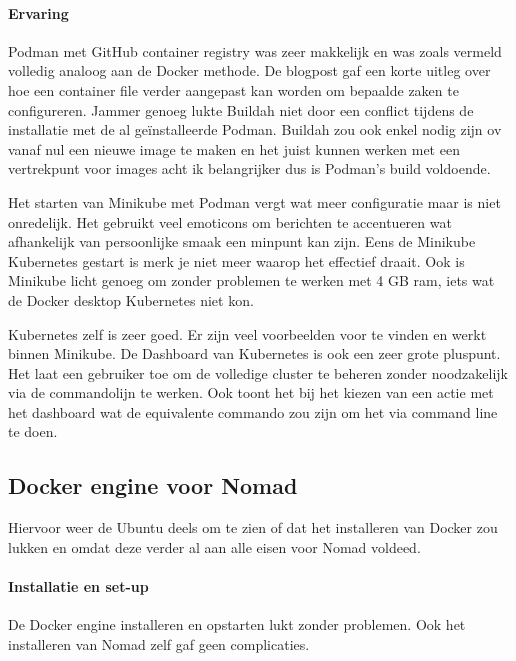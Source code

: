 \paragraph{Ervaring}
Podman met GitHub container registry was zeer makkelijk en was zoals vermeld volledig analoog aan de Docker methode. De blogpost gaf een korte uitleg over hoe een container file verder aangepast kan worden om bepaalde zaken te configureren. Jammer genoeg lukte Buildah niet door een conflict tijdens de installatie met de al geïnstalleerde Podman. Buildah zou ook enkel nodig zijn ov vanaf nul een nieuwe image te maken en het juist kunnen werken met een vertrekpunt voor images acht ik belangrijker dus is Podman’s build voldoende.

Het starten van Minikube met Podman vergt wat meer configuratie maar is niet onredelijk. Het gebruikt veel emoticons om berichten te accentueren wat afhankelijk van persoonlijke smaak een minpunt kan zijn. Eens de Minikube Kubernetes gestart is merk je niet meer waarop het effectief draait. Ook is Minikube licht genoeg om zonder problemen te werken met 4 GB ram, iets wat de Docker desktop Kubernetes niet kon.

Kubernetes zelf is zeer goed. Er zijn veel voorbeelden voor te vinden en werkt binnen Minikube. De Dashboard van Kubernetes is ook een zeer grote pluspunt. Het laat een gebruiker toe om de volledige cluster te beheren zonder noodzakelijk via de commandolijn te werken. Ook toont het bij het kiezen van een actie met het dashboard wat de equivalente commando zou zijn om het via command line te doen.


\subsection{Docker engine voor Nomad}
Hiervoor weer de Ubuntu deels om te zien of dat het installeren van Docker zou lukken en omdat deze verder al aan alle eisen voor Nomad voldeed.
\paragraph{Installatie en set-up}
De Docker engine installeren en opstarten lukt zonder problemen. Ook het installeren van Nomad zelf gaf geen complicaties.
